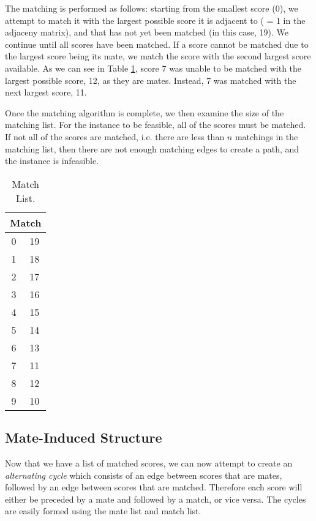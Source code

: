 \documentclass[a4paper, 11pt, twoside, onecolumn, openany]{article}
\begin{document}
The matching is performed as follows: starting from the smallest score (0), we attempt to match it with the largest possible score it is adjacent to ( = 1 in the adjaceny matrix), and that has not yet been matched (in this case, 19). We continue until all scores have been matched. If a score cannot be matched due to the largest score being its mate, we match the score with the second largest score available. As we can see in Table \ref{table:match}, score 7 was unable to be matched with the largest possible score, 12, as they are mates. Instead, 7 was matched with the next largest score, 11.

Once the matching algorithm is complete, we then examine the size of the matching list. For the instance to be feasible, all of the scores must be matched. If not all of the scores are matched, i.e. there are less than $n$ matchings in the matching list, then there are not enough matching edges to create a path, and the instance is infeasible. 

\begin{table}[htb]
	\centering
	\begin{tabular}{|c|c|}
		\hline
		\multicolumn{2}{|c|}{Match}\\ \hline
		0 & 19 \\ \hline
		1 & 18 \\ \hline
		2 & 17 \\ \hline
		3 & 16 \\ \hline
		4 & 15 \\ \hline
		5 & 14 \\ \hline
		6 & 13 \\ \hline
		7 & 11 \\ \hline
		8 & 12 \\ \hline
		9 & 10 \\
		\hline
	\end{tabular}
	\caption{Match List.}
	\label{table:match}
\end{table}	

\subsection{Mate-Induced Structure}
Now that we have a list of matched scores, we can now attempt to create an \textit{alternating cycle} which consists of an edge between scores that are mates, followed by an edge between scores that are matched. Therefore each score will either be preceded by a mate and followed by a match, or vice versa. The cycles are easily formed using the mate list and match list. 
\end{document}
